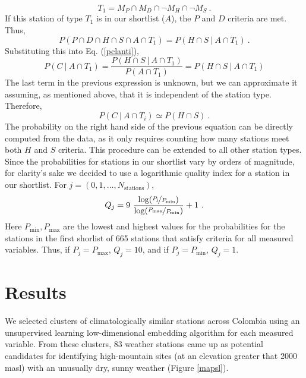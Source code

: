 \documentclass[12pt]{iopart}
\begin{document}
\begin{equation}
T_1=M_P\cap M_D\cap\neg M_H\cap\neg M_S\ .
\end{equation}
If this station of type $T_1$ is in our shortlist ($A$), the $P$ and $D$ criteria are met. Thus,
\begin{equation}
P(P\cap D\cap H\cap S\cap A\cap T_1)=P( H\cap S\ |\ A\cap T_1)\ .
\end{equation}
Substituting this into Eq. (\ref{pclanti}),
\begin{equation}
P(C\ |\ A\cap T_1)=\frac{P( H\cap S\ |\ A\cap T_1)}{P(A\cap T_1)}=P(H\cap S\ |\ A\cap T_1)
\end{equation}
The last term in the previous expression is unknown, but we can approximate it assuming, as mentioned above, that it is independent of the station type. Therefore, 
\begin{equation}
P(C\ |\ A\cap T_i)\simeq P(H\cap S)\ .
\end{equation}
The probability on the right hand side of the previous equation can be directly computed from the data, as it only requires counting how many stations meet both $H$ and $S$ criteria. This procedure can be extended to all other station types.\\

Since the probabilities for stations in our shortlist vary by orders of magnitude, for clarity's sake we decided to use a logarithmic quality index for a station in our shortlist. For $j=(0,1,...,N_\mathrm{stations})$,
\begin{equation}
Q_j=9\ \frac{\log (\nicefrac{P_\mathrm{j}}{P_\mathrm{min}})}{\log (\nicefrac{P_\mathrm{max}}{P_\mathrm{min}})}+1\ .
\end{equation}
Here $P_\mathrm{min},P_\mathrm{max}$ are the lowest and highest values for the probabilities for the stations in the first shorlist of 665 stations that satisfy criteria for all measured variables. Thus, if $P_j=P_\mathrm{max}$, $Q_j=10$, and if $P_j=P_\mathrm{min}$, $Q_j=1$.


\section{Results}

We selected clusters of climatologically similar stations across Colombia using an unsupervised learning low-dimensional embedding algorithm for each measured variable. From these clusters, 83 weather stations came up as potential candidates for identifying high-mountain sites (at an elevation greater that 2000 masl) with an unusually dry, sunny weather (Figure \ref{mapsl}).\\
\end{document}

